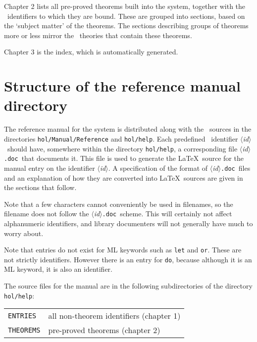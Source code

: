 \documentclass[12pt]{article}
\def\id{{$\langle${\it id\/}$\rangle$}}
\def\doc{{\tt .doc}}
\def\latex{{\LaTeX}}
\begin{document}
Chapter 2 lists all pre-proved theorems built into the system, \mbox{together}
with the \ML\ identifiers to which they are bound. These are grouped into
sections, based on the `subject matter' of the theorems.  The sections
describing groups of theorems more or less mirror the \HOL\ theories that
contain these theorems.

Chapter 3 is the index, which is automatically generated.

\section{Structure of the reference manual directory}

The reference manual for the system is distributed along with the \HOL\ sources
in the directories {\tt hol/Manual/Reference} and {\tt hol/help}.  Each
predefined \ML\ identifier \id\ should have, somewhere within the directory
{\tt hol/help}, a corresponding file \id\doc\ that documents it. This file is
used to generate the \latex\ source for the manual entry on the identifier \id.
A specification of the format of \id\doc\ files and an explanation of how they
are converted into \latex\ sources are given in the sections that follow.

Note that a few characters cannot conveniently be used in filenames, so
the filename does not follow the \id\doc\ scheme. This will certainly not
affect alphanumeric identifiers, and library documenters will not generally
have much to worry about.

Note that entries do not exist for ML keywords such as {\tt let} and {\tt or}.
These are not strictly identifiers. However there is an entry for {\tt do},
because although it is an ML keyword, it is also an identifier.

The source files for the manual are in the following subdirectories of the
directory {\tt hol/help}:

\vspace*{4mm plus2mm minus2mm}

\noindent\begin{tabular}{@{\qquad}l@{\hskip4mm ---\hskip4mm}l@{}}

   {\tt ENTRIES}   & all non-theorem identifiers (chapter 1)\\
   {\tt THEOREMS}  & pre-proved theorems (chapter 2)

\end{tabular}

\vspace*{4mm plus2mm minus2mm}
\end{document}
